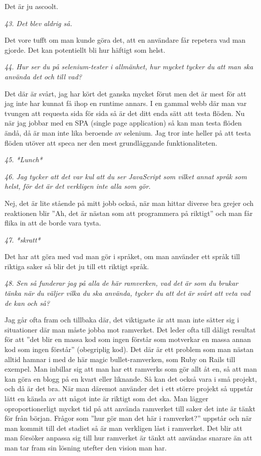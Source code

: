 \documentclass[11pt]{article}
\begin{document}
Det är ju ascoolt.

\emph{43. Det blev aldrig så.}

Det vore tufft om man kunde göra det, att en användare får repetera vad man gjorde. Det kan potentiellt bli hur häftigt som helst.

\emph{44. Hur ser du på selenium-tester i allmänhet, hur mycket tycker du att man ska använda det och till vad?}

Det där är svårt, jag har kört det ganska mycket förut men det är mest för att jag inte har kunnat få ihop en runtime annars. I en gammal webb där man var tvungen att requesta sida för sida så är det ditt enda sätt att testa flöden. Nu när jag jobbar med en SPA (single page application) så kan man testa flöden ändå, då är man inte lika beroende av selenium. Jag tror inte heller på att testa flöden utöver att speca ner den mest grundläggande funktionaliteten.

\emph{45. *Lunch*}

\emph{46. Jag tycker att det var kul att du ser JavaScript som vilket annat språk som helst, för det är det verkligen inte alla som gör.}

Nej, det är lite stående på mitt jobb också, när man hittar diverse bra grejer och reaktionen blir ”Ah, det är nästan som att programmera på riktigt” och man får flika in att de borde vara tysta.

\emph{47. *skratt*}

Det har att göra med vad man gör i språket, om man använder ett språk till riktiga saker så blir det ju till ett riktigt språk.

\emph{48. Sen så funderar jag på alla de här ramverken, vad det är som du brukar tänka när du väljer vilka du ska använda, tycker du att det är svårt att veta vad de kan och så?}

Jag går ofta fram och tillbaka där, det viktigaste är att man inte sätter sig i situationer där man måste jobba mot ramverket. Det leder ofta till dåligt resultat för att ”det blir en massa kod som ingen förstår som motverkar en massa annan kod som ingen förstår” (obegriplig kod). Det där är ett problem som man nästan alltid hamnar i med de här magic bullet-ramverken, som Ruby on Rails till exempel. Man inbillar sig att man har ett ramverks som gör allt åt en, så att man kan göra en blogg på en kvart eller liknande. Så kan det också vara i små projekt, och då är det bra. När man däremot använder det i ett större projekt så uppstår lätt en känsla av att något inte är riktigt som det ska. Man lägger oproportionerligt mycket tid på att använda ramverket till saker det inte är tänkt för från början. Frågor som ”hur gör man det här i ramverket?” uppstår och när man kommit till det stadiet så är man verkligen låst i ramverket. Det blir att man försöker anpassa sig till hur ramverket är tänkt att användas snarare än att man tar fram sin lösning utefter den vision man har.
\end{document}
